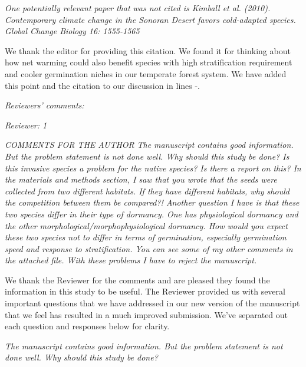 \documentclass[11pt]{article}
\begin{document}
\emph{One potentially relevant paper that was not cited is Kimball et al. (2010). Contemporary climate change in the Sonoran Desert favors cold-adapted species. Global Change Biology 16: 1555-1565}

We thank the editor for providing this citation. We found it for thinking about how net warming could also benefit species with high stratification requirement and cooler germination niches in our temperate forest system. We have added this point and the citation to our discussion in lines -.

\emph{Reviewers’ comments:}

\emph{Reviewer: 1}

\emph{COMMENTS FOR THE AUTHOR}
\emph{The manuscript contains good information. But the problem statement is not done well. Why should this study be done? Is this invasive species a problem for the native species? Is there a report on this? In the materials and methods section, I saw that you wrote that the seeds were collected from two different habitats. If they have different habitats, why should the competition between them be compared?! Another question I have is that these two species differ in their type of dormancy. One has physiological dormancy and the other morphological/morphophysiological dormancy. How would you expect these two species not to differ in terms of germination, especially germination speed and response to stratification. You can see some of my other comments in the attached file. With these problems I have to reject the manuscript.}

We thank the Reviewer for the comments and are pleased they found the information in this study to be useful. The Reviewer provided us with several important questions that we have addressed in our new version of the manuscript that we feel has resulted in a much improved submission. We've separated out each question and responses below for clarity.

\emph{The manuscript contains good information. But the problem statement is not done well. Why should this study be done?} 
\end{document}
